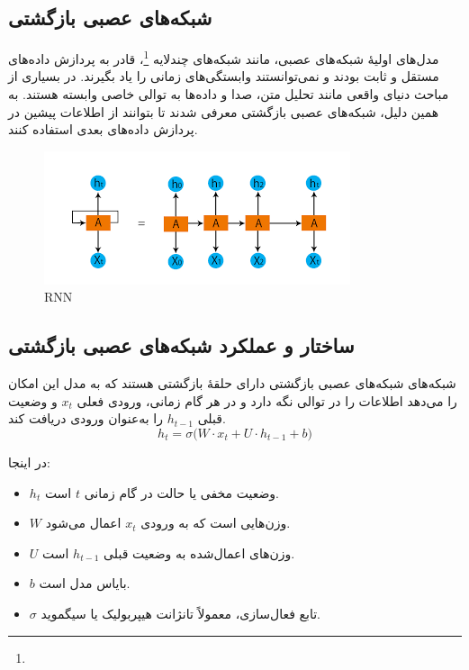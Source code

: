 \subsection{شبکه‌های عصبی بازگشتی}
مدل‌های اولیهٔ شبکه‌های عصبی، مانند شبکه‌های چندلایه \footnote{}، قادر به پردازش داده‌های مستقل و ثابت بودند و نمی‌توانستند وابستگی‌های زمانی را یاد بگیرند\cite{bishop2006pattern}.
در بسیاری از مباحث دنیای واقعی مانند تحلیل متن، صدا و  داده‌ها به توالی خاصی وابسته هستند. به همین دلیل، شبکه‌های عصبی بازگشتی معرفی شدند تا بتوانند از اطلاعات پیشین در پردازش داده‌های بعدی استفاده کنند\cite{rumelhart1986learning}.



 \begin{figure}[h]
	\centering
	\begin{minipage}[b]{0.7\textwidth}
		\centering
		\includegraphics[width=\textwidth]{transformer_images/rnn_image.png}
		\caption{RNN}
		\label{fig:RNN}
	\end{minipage}
	\hfill
	
\end{figure}








\subsection{ساختار و عملکرد شبکه‌های عصبی بازگشتی}
شبکه‌های شبکه‌های عصبی بازگشتی دارای حلقهٔ بازگشتی هستند که به مدل این امکان را می‌دهد اطلاعات را در توالی نگه دارد و در هر گام زمانی، ورودی فعلی \( x_t \) و وضعیت قبلی \( h_{t-1} \) را به‌عنوان ورودی دریافت کند\cite{goodfellow2016deep}.
\begin{equation}
	h_t = \sigma \big( W \cdot x_t + U \cdot h_{t-1} + b \big)
\end{equation}

در اینجا:
\begin{itemize}
	\item \( h_t \) وضعیت مخفی یا حالت در گام زمانی \( t \) است.
	\item \( W \) وزن‌هایی است که به ورودی \( x_t \) اعمال می‌شود.
	\item \( U \) وزن‌های اعمال‌شده به وضعیت قبلی \( h_{t-1} \) است.
	\item \( b \) بایاس مدل است.
	\item \( \sigma \) تابع فعال‌سازی، معمولاً تانژانت هیپربولیک یا سیگموید.
\end{itemize}

